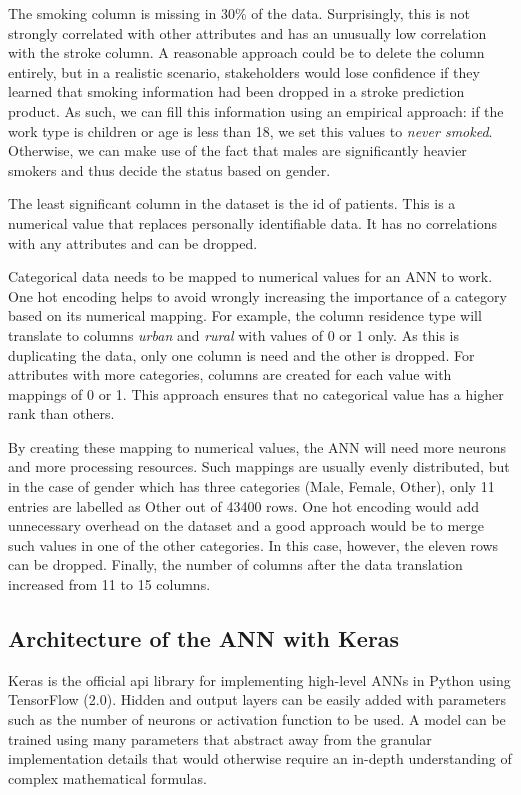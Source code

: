 \documentclass[proposal]{softeng}
\begin{document}
The smoking column is missing in 30\% of the data. Surprisingly, this is not strongly correlated with other attributes and has an unusually low correlation with the stroke column. A reasonable approach could be to delete the column entirely, but in a realistic scenario, stakeholders would lose confidence if they learned that smoking information had been dropped in a stroke prediction product. As such, we can fill this information using an empirical approach: if the work type is children or age is less than 18, we set this values to\textit{ never smoked}. Otherwise, we can make use of the fact that males are significantly heavier smokers and thus decide the status based on gender.

The least significant column in the dataset is the id of patients. This is a numerical value that replaces personally identifiable data. It has no correlations with any attributes and can be dropped.

Categorical data needs to be mapped to numerical values for an ANN to work. One hot encoding helps to avoid wrongly increasing the importance of a category based on its numerical mapping. For example, the column residence type will translate to columns \textit{urban} and \textit{rural} with values of 0 or 1 only. As this is duplicating the data, only one column is need and the other is dropped. For attributes with more categories, columns are created for each value with mappings of 0 or 1. This approach ensures that no categorical value has a higher rank than others.

By creating these mapping to numerical values, the ANN will need more neurons and more processing resources. Such mappings are usually evenly distributed, but in the case of gender which has three categories (Male, Female, Other), only 11 entries are labelled as Other out of 43400 rows. One hot encoding would add unnecessary overhead on the dataset and a good approach would be to merge such values in one of the other categories. In this case, however, the eleven rows can be dropped. Finally, the number of columns after the data translation increased from 11 to 15 columns.

\subsection{Architecture of the ANN with Keras}

Keras\cite{keras} is the official api library for implementing high-level ANNs in Python using TensorFlow (2.0). Hidden and output layers can be easily added with parameters such as the number of neurons or activation function to be used. A model can be trained using many parameters that abstract away from the granular implementation details that would otherwise require an in-depth understanding of complex mathematical formulas.
\end{document}

